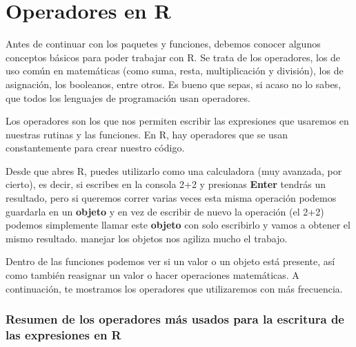 \documentclass[
  letterpaper,
  DIV=11,
  numbers=noendperiod]{scrreprt}
\begin{document}

\chapter{Operadores en R}\label{operadores-en-r}

Antes de continuar con los paquetes y funciones, debemos conocer algunos
conceptos básicos para poder trabajar con R. Se trata de los operadores,
los de uso común en matemáticas (como suma, resta, multiplicación y
división), los de asignación, los booleanos, entre otros. Es bueno que
sepas, si acaso no lo sabes, que todos los lenguajes de programación
usan operadores.

Los operadores son los que nos permiten escribir las expresiones que
usaremos en nuestras rutinas y las funciones. En R, hay operadores que
se usan constantemente para crear nuestro código.

Desde que abres R, puedes utilizarlo como una calculadora (muy avanzada,
por cierto), es decir, si escribes en la consola 2+2 y presionas
\textbf{Enter} tendrás un resultado, pero si queremos correr varias
veces esta misma operación podemos guardarla en un \textbf{objeto} y en
vez de escribir de nuevo la operación (el 2+2) podemos simplemente
llamar este \textbf{objeto} con solo escribirlo y vamos a obtener el
mismo resultado. manejar los objetos nos agiliza mucho el trabajo.

Dentro de las funciones podemos ver si un valor o un objeto está
presente, así como también reasignar un valor o hacer operaciones
matemáticas. A continuación, te mostramos los operadores que
utilizaremos con más frecuencia.

\subsection{\texorpdfstring{\textbf{Resumen de los operadores más usados
para la escritura de las expresiones en
R}}{Resumen de los operadores más usados para la escritura de las expresiones en R}}\label{resumen-de-los-operadores-muxe1s-usados-para-la-escritura-de-las-expresiones-en-r}
\end{document}
